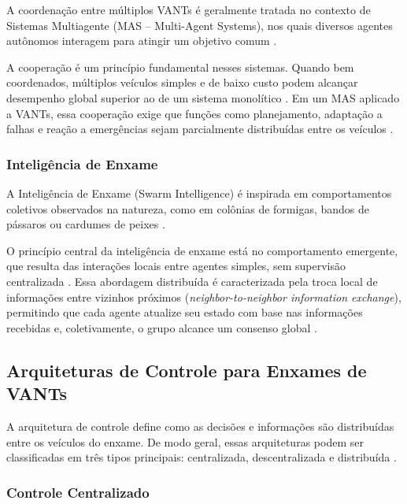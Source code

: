 A coordenação entre múltiplos VANTs é geralmente tratada no contexto de Sistemas Multiagente (MAS – Multi-Agent Systems), nos quais diversos agentes autônomos interagem para atingir um objetivo comum \citep{bu2024advancement, chung2018survey}.

A cooperação é um princípio fundamental nesses sistemas. Quando bem coordenados, múltiplos veículos simples e de baixo custo podem alcançar desempenho global superior ao de um sistema monolítico \citep{ren2007consensus}. Em um MAS aplicado a VANTs, essa cooperação exige que funções como planejamento, adaptação a falhas e reação a emergências sejam parcialmente distribuídas entre os veículos \citep{dong2004behavior}.

\subsubsection{Inteligência de Enxame}

A Inteligência de Enxame (Swarm Intelligence) é inspirada em comportamentos coletivos observados na natureza, como em colônias de formigas, bandos de pássaros ou cardumes de peixes \citep{bu2024advancement, chung2018survey}.

O princípio central da inteligência de enxame está no comportamento emergente, que resulta das interações locais entre agentes simples, sem supervisão centralizada \citep{chung2018survey}. Essa abordagem distribuída é caracterizada pela troca local de informações entre vizinhos próximos (\textit{neighbor-to-neighbor information exchange}), permitindo que cada agente atualize seu estado com base nas informações recebidas e, coletivamente, o grupo alcance um consenso global \citep{ren2007consensus, bu2024advancement}.

\subsection{Arquiteturas de Controle para Enxames de VANTs}

A arquitetura de controle define como as decisões e informações são distribuídas entre os veículos do enxame. De modo geral, essas arquiteturas podem ser classificadas em três tipos principais: centralizada, descentralizada e distribuída \citep{bu2024advancement}.

\subsubsection{Controle Centralizado}

